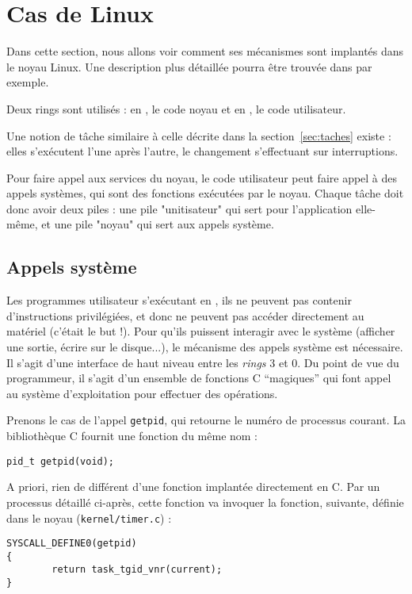 \section{Cas de Linux}

Dans cette section, nous allons voir comment ses mécanismes sont implantés dans
le noyau Linux. Une description plus détaillée pourra être trouvée dans
\cite{UnderstandingTheLinuxKernel} par exemple.

Deux rings sont utilisés : en , le code noyau et en , le code
utilisateur.

Une notion de tâche similaire à celle décrite dans la section~\ref{sec:taches}
existe : elles s'exécutent l'une après l'autre, le changement s'effectuant sur
interruptions.

Pour faire appel aux services du noyau, le code utilisateur peut faire appel à
des appels systèmes, qui sont des fonctions exécutées par le noyau. Chaque tâche
doit donc avoir deux piles : une pile "unitisateur" qui sert pour l'application
elle-même, et une pile "noyau" qui sert aux appels système.

\subsection{Appels système}

Les programmes utilisateur s'exécutant en , ils ne peuvent pas
contenir d'instructions privilégiées, et donc ne peuvent pas accéder directement
au matériel (c'était le but !). Pour qu'ils puissent interagir avec le système
(afficher une sortie, écrire sur le disque...), le mécanisme des appels système
est nécessaire. Il s'agit d'une interface de haut niveau entre les \emph{rings}
3 et 0. Du point de vue du programmeur, il s'agit d'un ensemble de fonctions C
``magiques'' qui font appel au système d'exploitation pour effectuer des
opérations.

Prenons le cas de l'appel \texttt{getpid}, qui retourne le numéro de processus
courant. La bibliothèque C fournit une fonction du même nom :

\begin{Verbatim}
pid_t getpid(void);
\end{Verbatim}

A priori, rien de différent d'une fonction implantée directement en C. Par un
processus détaillé ci-après, cette fonction va invoquer la fonction, suivante,
définie dans le noyau (\texttt{kernel/timer.c}) :

\begin{Verbatim}
SYSCALL_DEFINE0(getpid)
{
        return task_tgid_vnr(current);
}
\end{Verbatim}



